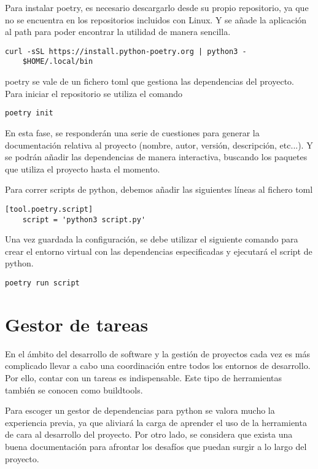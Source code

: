 Para instalar \gls{poetry}, es necesario descargarlo desde su propio repositorio, ya que no se encuentra en los repositorios incluidos con Linux. Y se añade la aplicación al \gls{path} para poder encontrar la utilidad de manera sencilla.
\begin{lstlisting}[style=consola]
	curl -sSL https://install.python-poetry.org | python3 -
	$HOME/.local/bin
\end{lstlisting}

\gls{poetry} se vale de un fichero \gls{toml} que gestiona las \glspl{dependencia} del proyecto. Para iniciar el \gls{repositorio} se utiliza el comando
\begin{lstlisting}[style=consola]
	poetry init
\end{lstlisting}

En esta fase, se responderán una serie de cuestiones para generar la documentación relativa al proyecto (nombre, autor, versión, descripción, etc...). Y se podrán añadir las \glspl{dependencia} de manera interactiva, buscando los paquetes que utiliza el proyecto hasta el momento.

Para correr \glspl{script} de \gls{python}, debemos añadir las siguientes líneas al fichero \gls{toml}
\begin{lstlisting}[style=consola]
	[tool.poetry.script]
	script = 'python3 script.py'
\end{lstlisting}

Una vez guardada la configuración, se debe utilizar el siguiente comando para crear el entorno virtual con las \glspl{dependencia} especificadas y ejecutará el \gls{script} de \gls{python}. 
\begin{lstlisting}[style=consola]
	poetry run script
\end{lstlisting}

\section{Gestor de tareas}
En el ámbito del desarrollo de software y la gestión de proyectos cada vez es más complicado llevar a cabo una coordinación entre todos los entornos de desarrollo. Por ello, contar con un \gls{tareas} es indispensable. Este tipo de herramientas también se conocen como \gls{buildtools}. 

Para escoger un gestor de dependencias para \Gls{python} se valora mucho la experiencia previa, ya que aliviará la carga de aprender el uso de la herramienta de cara al desarrollo del proyecto. Por otro lado, se considera que exista una buena documentación para afrontar los desafíos que puedan surgir a lo largo del proyecto. 

